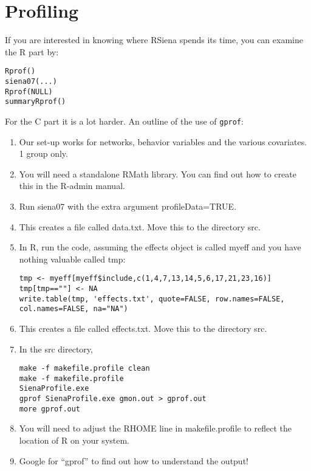 \documentclass[12pt, a4paper]{article}
\renewcommand{\=}{\,=\,}
\newcommand{\+}{\,+\,}
\begin{document}
\section{Profiling}
If you are interested in knowing where RSiena spends its time, you can examine
the R part by:
\begin{verbatim}
Rprof()
siena07(...)
Rprof(NULL)
summaryRprof()
\end{verbatim}
For the C part it is a lot harder. An outline of the use of \verb|gprof|:
\begin{enumerate}
\item Our set-up works for networks, behavior variables and the various
  covariates. 1 group only.
\item You will need a standalone RMath library. You can find out how to create
  this in the R-admin manual.
\item Run siena07 with the extra argument \textsf{profileData=TRUE}.
\item This creates a file called \textsf{data.txt}. Move this to the directory
  \textsf{src}.
\item In R, run the code, assuming the effects object is called \textsf{myeff}
  and you have nothing valuable called \textsf{tmp}:
\begin{verbatim}
tmp <- myeff[myeff$include,c(1,4,7,13,14,5,6,17,21,23,16)]
tmp[tmp==""] <- NA
write.table(tmp, 'effects.txt', quote=FALSE, row.names=FALSE,
col.names=FALSE, na="NA")
\end{verbatim}
\item This creates a file called \textsf{effects.txt}.  Move this to the
  directory \textsf{src}.
\item In the \textsf{src} directory,
\begin{verbatim}
make -f makefile.profile clean
make -f makefile.profile
SienaProfile.exe
gprof SienaProfile.exe gmon.out > gprof.out
more gprof.out
\end{verbatim}
\item You will need to adjust the \textsf{RHOME} line in
  \textsf{makefile.profile} to reflect the location of R on your system.
\item Google for ``gprof'' to find out how to understand the output!
\end{enumerate}
\end{document}
